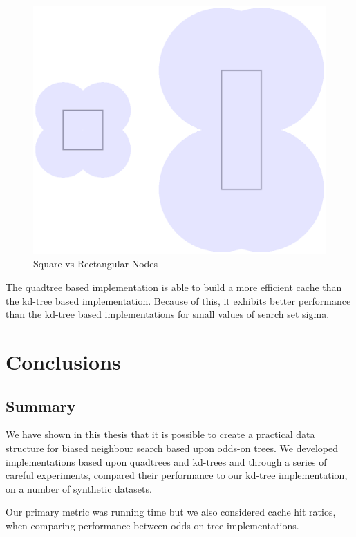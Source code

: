\documentclass[mcs]{scsthesis}
\begin{document}
\begin{figure}
\begin{center}
\includegraphics[scale=0.5]{diagrams/node_coverage.eps}
\caption{Square vs Rectangular Nodes}
\label{fig:node_coverage}
\end{center}
\end{figure}

The quadtree based implementation is able to build a more efficient cache than
the kd-tree based implementation. Because of this, it exhibits better
performance than the kd-tree based implementations for small values of search
set sigma.

\chapter{Conclusions}

\section{Summary}

We have shown in this thesis that it is possible to create a practical data
structure for biased neighbour search based upon odds-on trees. We developed
implementations based upon quadtrees and kd-trees and through a series of
careful experiments, compared their performance to our kd-tree implementation,
on a number of synthetic datasets.

Our primary metric was running time but we also considered cache hit ratios,
when comparing performance between odds-on tree implementations.
\end{document}
